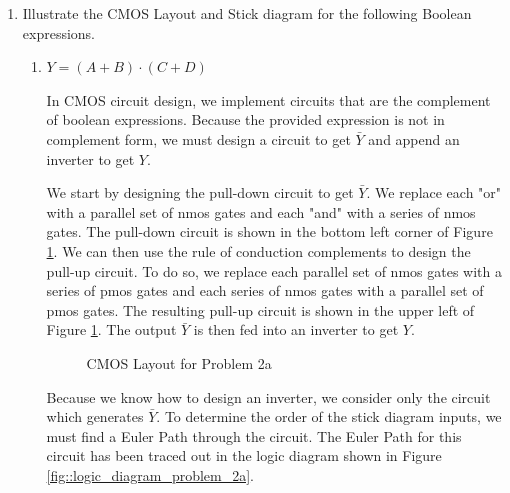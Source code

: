 \documentclass[fleqn]{article}
\begin{document}
\begin{enumerate}
		\item Illustrate the CMOS Layout and Stick diagram for the following Boolean expressions.
		
		\begin{enumerate}
			\item $Y = (A+B)\cdot(C+D)$
			
			In CMOS circuit design, we implement circuits that are the complement of boolean expressions. Because the provided expression is not in complement form, we must design a circuit to get $\bar{Y}$ and append an inverter to get $Y$.
			
			We start by designing the pull-down circuit to get $\bar{Y}$. We replace each "or" with a parallel set of nmos gates and each "and" with a series of nmos gates. The pull-down circuit is shown in the bottom left corner of Figure \ref{fig::cmos_layout_problem_2a}. We can then use the rule of conduction complements to design the pull-up circuit. To do so, we replace each parallel set of nmos gates with a series of pmos gates and each series of nmos gates with a parallel set of pmos gates. The resulting pull-up circuit is shown in the upper left of Figure \ref{fig::cmos_layout_problem_2a}. The output $\bar{Y}$ is then fed into an inverter to get $Y$.
			
			\begin{figure}[H]
				\centerline{}
				\caption{CMOS Layout for Problem 2a}
				\label{fig::cmos_layout_problem_2a}
			\end{figure}
			
			Because we know how to design an inverter, we consider only the circuit which generates $\bar{Y}$. To determine the order of the stick diagram inputs, we must find a Euler Path through the circuit. The Euler Path for this circuit has been traced out in the logic diagram shown in Figure \ref{fig::logic_diagram_problem_2a}.
			

\end{enumerate}
\end{enumerate}
\end{document}
